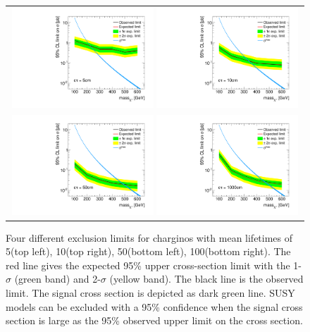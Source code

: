 \begin{figure}[!h]
  \centering 
  \vspace{70pt}
  \begin{tabular}{c}
    \includegraphics[width=0.49\textwidth]{figures/analysis/Interpretation/ExclusionLimits/LimitPlot_ctau5cm.pdf} 
    \includegraphics[width=0.49\textwidth]{figures/analysis/Interpretation/ExclusionLimits/LimitPlot_ctau10cm.pdf} \\
    \includegraphics[width=0.49\textwidth]{figures/analysis/Interpretation/ExclusionLimits/LimitPlot_ctau50cm.pdf} 
    \includegraphics[width=0.49\textwidth]{figures/analysis/Interpretation/ExclusionLimits/LimitPlot_ctau1000cm.pdf} 
  \end{tabular}
  \caption{Four different exclusion limits for charginos with mean lifetimes of 5\cm (top left), 10\cm (top right), 50\cm (bottom left), 100\cm (bottom right).
           The red line gives the expected 95\% upper cross-section limit with the 1-$\sigma$ (green band) and 2-$\sigma$ (yellow band).
           The black line is the observed limit.
           The signal cross section is depicted as dark green line. 
           SUSY models can be excluded with a 95\% confidence when the signal cross section is large as the 95\% observed upper limit on the cross section.}
  \label{fig:1dLimits}
\end{figure} 

